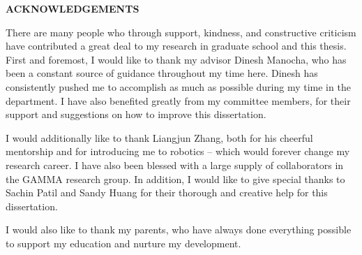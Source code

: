 \begin{center}
\vspace*{52pt}
{\Large \textbf{ACKNOWLEDGEMENTS}}
\end{center}

There are many people who through support, kindness, and constructive criticism have contributed a great deal to my research in graduate school and this thesis. First and foremost, I would like to thank my advisor Dinesh Manocha, who has been a constant source of guidance throughout my time here.  Dinesh has consistently pushed me to accomplish as much as possible during my time in the department. I have also benefited greatly from my committee members, for their support and suggestions on how to improve this dissertation.

I would additionally like to thank Liangjun Zhang, both for his cheerful mentorship and for introducing me to robotics -- which would forever change my research career. I have also been blessed with a large supply of collaborators in the GAMMA research group. In addition, I would like to give special thanks to Sachin Patil and Sandy Huang for their thorough and creative help for this dissertation.

I would also like to thank my parents, who have always done everything possible to support my education and nurture my development.
